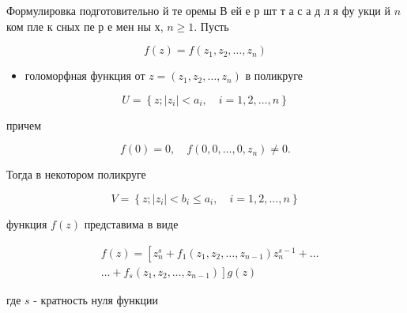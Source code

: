 \documentclass[10pt]{article}
\begin{document}
Формулировка подготовительно й те оремы В ей е р шт т а с а д л я фу укци й $n$ ком пле к сных пе р е мен ны х, $n \geqslant 1$. Пусть



\[

f(z)=f\left(z_{1}, z_{2}, \ldots, z_{n}\right)

\]



\begin{itemize}

  \item голоморфная функция от $z=\left(z_{1}, z_{2}, \ldots, z_{n}\right)$ в поликруге

\end{itemize}



\[

U=\left\{z ;\left|z_{i}\right|<a_{i}, \quad i=1,2, \ldots, n\right\}

\]



причем



\[

f(0)=0, \quad f\left(0,0, \ldots, 0, z_{n}\right) \neq 0 .

\]



Тогда в некотором поликруге



\[

V=\left\{z ;\left|z_{i}\right|<b_{i} \leqslant a_{i}, \quad i=1,2, \ldots, n\right\}

\]



функция $f(z)$ представима в виде



\[

\begin{aligned}

& f(z)=\left[z_{n}^{s}+f_{1}\left(z_{1}, z_{2}, \ldots, z_{n-1}\right) z_{n}^{s-1}+\ldots\right. \\

&\left.\ldots+f_{s}\left(z_{1}, z_{2}, \ldots, z_{n-1}\right)\right] g(z)

\end{aligned}

\]



где $s$ - кратность нуля функции
\end{document}
